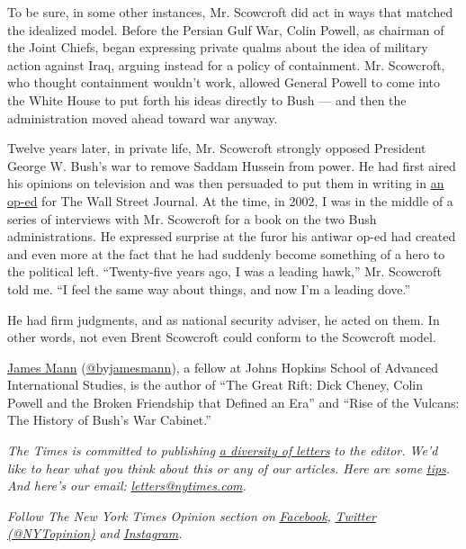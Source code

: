 To be sure, in some other instances, Mr. Scowcroft did act in ways that
matched the idealized model. Before the Persian Gulf War, Colin Powell,
as chairman of the Joint Chiefs, began expressing private qualms about
the idea of military action against Iraq, arguing instead for a policy
of containment. Mr. Scowcroft, who thought containment wouldn't work,
allowed General Powell to come into the White House to put forth his
ideas directly to Bush --- and then the administration moved ahead
toward war anyway.

Twelve years later, in private life, Mr. Scowcroft strongly opposed
President George W. Bush's war to remove Saddam Hussein from power. He
had first aired his opinions on television and was then persuaded to put
them in writing in
\href{https://www.wsj.com/articles/SB1029371773228069195}{an op-ed} for
The Wall Street Journal. At the time, in 2002, I was in the middle of a
series of interviews with Mr. Scowcroft for a book on the two Bush
administrations. He expressed surprise at the furor his antiwar op-ed
had created and even more at the fact that he had suddenly become
something of a hero to the political left. ``Twenty-five years ago, I
was a leading hawk,'' Mr. Scowcroft told me. ``I feel the same way about
things, and now I'm a leading dove.''

He had firm judgments, and as national security adviser, he acted on
them. In other words, not even Brent Scowcroft could conform to the
Scowcroft model.

\href{http://james-mann.com/}{James Mann}
(\href{https://twitter.com/byjamesmann?lang=en}{@byjamesmann}), a fellow
at Johns Hopkins School of Advanced International Studies, is the author
of ``The Great Rift: Dick Cheney, Colin Powell and the Broken Friendship
that Defined an Era'' and ``Rise of the Vulcans: The History of Bush's
War Cabinet.''

\emph{The Times is committed to publishing}
\href{https://www.nytimes.com/2019/01/31/opinion/letters/letters-to-editor-new-york-times-women.html}{\emph{a
diversity of letters}} \emph{to the editor. We'd like to hear what you
think about this or any of our articles. Here are some}
\href{https://help.nytimes.com/hc/en-us/articles/115014925288-How-to-submit-a-letter-to-the-editor}{\emph{tips}}\emph{.
And here's our email:}
\href{mailto:letters@nytimes.com}{\emph{letters@nytimes.com}}\emph{.}

\emph{Follow The New York Times Opinion section on}
\href{https://www.facebook.com/nytopinion}{\emph{Facebook}}\emph{,}
\href{http://twitter.com/NYTOpinion}{\emph{Twitter (@NYTopinion)}}
\emph{and}
\href{https://www.instagram.com/nytopinion/}{\emph{Instagram}}\emph{.}

